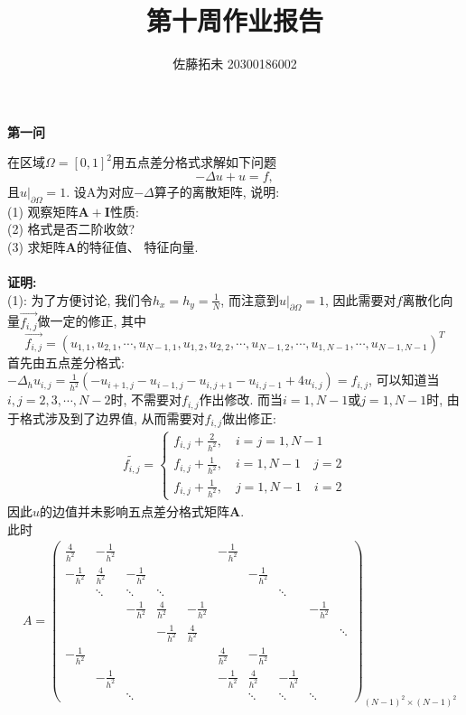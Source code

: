\documentclass[12pt]{article}
\title{第十周作业报告}
\author{佐藤拓未 20300186002}
\date{}
\begin{document}
	\maketitle
	
	\begin{center}
		\textbf{第一问}
	\end{center}
\noindent 在区域$\Omega=[0,1]^2$用五点差分格式求解如下问题$$-\Delta u +u=f,$$
\noindent 且$u\vert_{\partial \Omega}=1$. 设A为对应$-\Delta$算子的离散矩阵, 说明:\\
\quad \quad  (1) 观察矩阵$\boldsymbol{A+I}$性质:\\
\quad \quad (2) 格式是否二阶收敛?\\
\quad \quad (3) 求矩阵$\boldsymbol{A}$的特征值、 特征向量.\\
\quad \\
\noindent \textbf{证明:} \\
(1): 为了方便讨论, 我们令$h_x=h_y=\frac{1}{N}$, 而注意到$u\vert _{\partial \Omega}=1$, 因此需要对$f$离散化向量$\overset{\rightarrow}{f_{i,j}}$做一定的修正, 其中$$\overset{\rightarrow}{f_{i,j}}=(u_{1,1},u_{2,1},\cdots,u_{N-1,1},u_{1,2},u_{2,2},\cdots,u_{N-1,2},\cdots,u_{1,N-1},\cdots,u_{N-1,N-1})^T$$
首先由五点差分格式: $-\Delta_h u_{i,j}=\frac{1}{h^2}(-u_{i+1,j}-u_{i-1,j}-u_{i,j+1}-u_{i,j-1}+4u_{i,j})=f_{i,j}$, 可以知道当$i,j=2,3,\cdots,N-2$时, 不需要对$f_{i,j}$作出修改. 而当$i=1,N-1$或$j=1,N-1$时, 由于格式涉及到了边界值, 从而需要对$f_{i,j}$做出修正: 
\begin{align*}
	\widetilde{f_{i,j}}=\begin{cases}
		f_{i,j}+\frac{2}{h^2}, \quad i=j=1,N-1\\
		f_{i,j}+\frac{1}{h^2}, \quad i=1,N-1\quad j=2\\
		f_{i,j}+\frac{1}{h^2}, \quad j=1,N-1\quad i=2
	\end{cases}
\end{align*}
\noindent 因此$u$的边值并未影响五点差分格式矩阵$\boldsymbol{A}$.\\
\noindent 此时
\begin{align*}
	&A=\begin{pmatrix}
		\frac{4}{h^2} & -\frac{1}{h^2} &&&&-\frac{1}{h^2}\\
		-\frac{1}{h^2} &\frac{4}{h^2} & -\frac{1}{h^2}&&&&-\frac{1}{h^2}\\
		& \ddots & \ddots & \ddots&&&&\ddots\\
		&&-\frac{1}{h^2} &\frac{4}{h^2} & -\frac{1}{h^2}&&&&-\frac{1}{h^2}\\
		&&&-\frac{1}{h^2} &\frac{4}{h^2} &&&&&\ddots\\
		-\frac{1}{h^2}&&&&&\frac{4}{h^2}&-\frac{1}{h^2}\\
		&-\frac{1}{h^2}&&&&-\frac{1}{h^2} & \frac{4}{h^2} &-\frac{1}{h^2}\\
		&&\ddots &&&&\ddots&\ddots&\ddots
	\end{pmatrix}_{(N-1)^2 \times (N-1)^2}
\end{align*}
\end{document}

